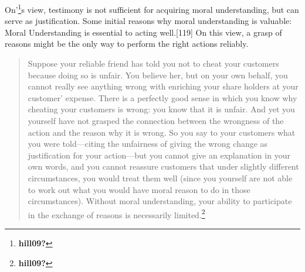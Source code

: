 \documentclass[phdthesis,12pt,final]{wuthesis}
\theoremstyle{definition}
\theoremstyle{definition}
\theoremstyle{definition}
\theoremstyle{definition}
\theoremstyle{remark}
\begin{document}
\begin{Shaded}
\begin{Highlighting}[]

\end{Highlighting}
\end{Shaded}

\begin{Shaded}
\begin{Highlighting}[]

\end{Highlighting}
\end{Shaded}

\begin{Shaded}
\begin{Highlighting}[]

\end{Highlighting}
\end{Shaded}

\begin{Shaded}
\begin{Highlighting}[]

\end{Highlighting}
\end{Shaded}

On'\footnote{\textbf{hill09?}}s view, testimony is not sufficient for acquiring moral understanding, but can serve as justification. Some initial reasons why moral understanding is valuable: Moral Understanding is essential to acting well.{[}119{]} On this view, a grasp of reasons might be the only way to perform the right actions reliably.

\begin{quote}
Suppose your reliable friend has told you not to cheat your customers because doing so is unfair. You believe her, but on your own behalf, you cannot really see anything wrong with enriching your share holders at your customer' expense. There is a perfectly good sense in which you know why cheating your customers is wrong: you know that it is unfair. And yet you yourself have not grasped the connection between the wrongness of the action and the reason why it is wrong. So you say to your customers what you were told---citing the unfairness of giving the wrong change as justification for your action---but you cannot give an explanation in your own words, and you cannot reassure customers that under slightly different circumstances, you would treat them well (since you yourself are not able to work out what you would have moral reason to do in those circumstances). Without moral understanding, your ability to participate in the exchange of reasons is necessarily limited.\footnote{\textbf{hill09?}}
\end{quote}
\end{document}
